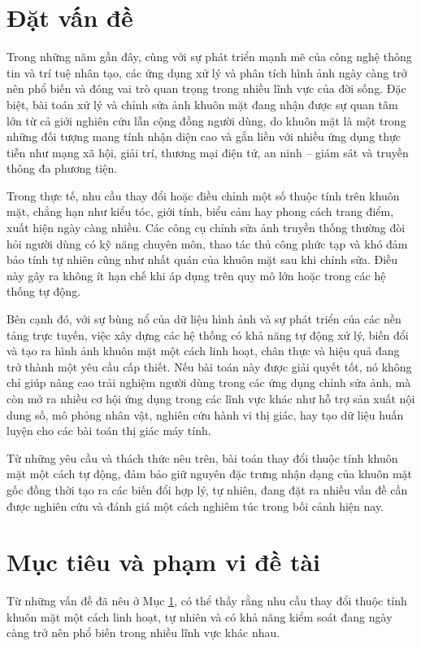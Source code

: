 \documentclass[../DoAn.tex]{subfiles}
\begin{document}
\section{Đặt vấn đề}
\label{section:1.1}
Trong những năm gần đây, cùng với sự phát triển mạnh mẽ của công nghệ thông tin và trí tuệ nhân tạo, các ứng dụng xử lý và phân tích hình ảnh ngày càng trở nên phổ biến và đóng vai trò quan trọng trong nhiều lĩnh vực của đời sống. Đặc biệt, bài toán xử lý và chỉnh sửa ảnh khuôn mặt đang nhận được sự quan tâm lớn từ cả giới nghiên cứu lẫn cộng đồng người dùng, do khuôn mặt là một trong những đối tượng mang tính nhận diện cao và gắn liền với nhiều ứng dụng thực tiễn như mạng xã hội, giải trí, thương mại điện tử, an ninh – giám sát và truyền thông đa phương tiện.

Trong thực tế, nhu cầu thay đổi hoặc điều chỉnh một số thuộc tính trên khuôn mặt, chẳng hạn như kiểu tóc, giới tính, biểu cảm hay phong cách trang điểm, xuất hiện ngày càng nhiều. Các công cụ chỉnh sửa ảnh truyền thống thường đòi hỏi người dùng có kỹ năng chuyên môn, thao tác thủ công phức tạp và khó đảm bảo tính tự nhiên cũng như nhất quán của khuôn mặt sau khi chỉnh sửa. Điều này gây ra không ít hạn chế khi áp dụng trên quy mô lớn hoặc trong các hệ thống tự động.

Bên cạnh đó, với sự bùng nổ của dữ liệu hình ảnh và sự phát triển của các nền tảng trực tuyến, việc xây dựng các hệ thống có khả năng tự động xử lý, biến đổi và tạo ra hình ảnh khuôn mặt một cách linh hoạt, chân thực và hiệu quả đang trở thành một yêu cầu cấp thiết. Nếu bài toán này được giải quyết tốt, nó không chỉ giúp nâng cao trải nghiệm người dùng trong các ứng dụng chỉnh sửa ảnh, mà còn mở ra nhiều cơ hội ứng dụng trong các lĩnh vực khác như hỗ trợ sản xuất nội dung số, mô phỏng nhân vật, nghiên cứu hành vi thị giác, hay tạo dữ liệu huấn luyện cho các bài toán thị giác máy tính.

Từ những yêu cầu và thách thức nêu trên, bài toán thay đổi thuộc tính khuôn mặt một cách tự động, đảm bảo giữ nguyên đặc trưng nhận dạng của khuôn mặt gốc đồng thời tạo ra các biến đổi hợp lý, tự nhiên, đang đặt ra nhiều vấn đề cần được nghiên cứu và đánh giá một cách nghiêm túc trong bối cảnh hiện nay.

\section{Mục tiêu và phạm vi đề tài}
\label{section:1.2}
Từ những vấn đề đã nêu ở Mục \ref{section:1.1}, có thể thấy rằng nhu cầu thay đổi thuộc tính khuôn mặt một cách linh hoạt, tự nhiên và có khả năng kiểm soát đang ngày càng trở nên phổ biến trong nhiều lĩnh vực khác nhau.
\end{document}
